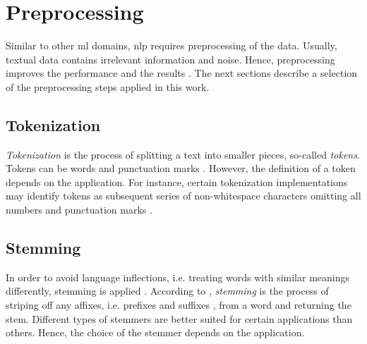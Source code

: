\section{Preprocessing}\label{sec:preprocessing}

Similar to other \ac{ml} domains, \ac{nlp} requires preprocessing of the data.
Usually, textual data contains irrelevant information and noise.
Hence, preprocessing improves the performance and the results \cite{clusteringDocs2020}.
The next sections describe a selection of the preprocessing steps applied in this work.


\subsection{Tokenization}\label{subsec:tokenization}

\textit{Tokenization} is the process of splitting a text into smaller pieces, so-called \textit{tokens}.
Tokens can be words and punctuation marks \cite{nlp-book2009}.
However, the definition of a token depends on the application.
For instance, certain tokenization implementations may identify tokens as subsequent series of non-whitespace characters omitting all numbers and punctuation marks \cite{IR2011}.


\subsection{Stemming}\label{subsec:stemming}

In order to avoid language inflections, i.e. treating words with similar meanings differently, stemming is applied \cite{clusteringDocs2020}.
According to \citeauthor{nlp-book2009}, \textit{stemming} is the process of striping off any affixes, i.e. prefixes and suffixes \cite{IR2011}, 
from a word and returning the stem.
Different types of stemmers are better suited for certain applications than others.
Hence, the choice of the stemmer depends on the application.


